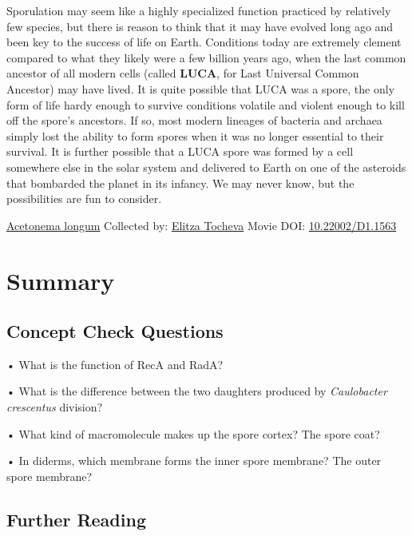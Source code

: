 \documentclass[]{tufte-book}
\begin{document}
Sporulation may seem like a highly specialized function practiced by relatively few species, but there is reason to think that it may have evolved long ago and been key to the success of life on Earth. Conditions today are extremely clement compared to what they likely were a few billion years ago, when the last common ancestor of all modern cells (called \textbf{LUCA}, for Last Universal Common Ancestor) may have lived. It is quite possible that LUCA was a spore, the only form of life hardy enough to survive conditions volatile and violent enough to kill off the spore's ancestors. If so, most modern lineages of bacteria and archaea simply lost the ability to form spores when it was no longer essential to their survival. It is further possible that a LUCA spore was formed by a cell somewhere else in the solar system and delivered to Earth on one of the asteroids that bombarded the planet in its infancy. We may never know, but the possibilities are fun to consider.



\hypertarget{htmlwidget-cfa92537eda9ede0c0c4}{}

\label{fig:8-11}\protect\hyperlink{tree}{Acetonema longum} Collected by: \protect\hyperlink{elitza_tocheva}{Elitza Tocheva} Movie DOI: \href{https://doi.org/10.22002/D1.1563}{10.22002/D1.1563}

\hypertarget{summary-7}{%
\section{Summary}\label{summary-7}}

\hypertarget{concept-check-questions-7}{%
\subsection*{Concept Check Questions}\label{concept-check-questions-7}}

• What is the function of RecA and RadA?

• What is the difference between the two daughters produced by \emph{Caulobacter crescentus} division?

• What kind of macromolecule makes up the spore cortex? The spore coat?

• In diderms, which membrane forms the inner spore membrane? The outer spore membrane?

\hypertarget{further-reading-7}{%
\subsection*{Further Reading}\label{further-reading-7}}
\end{document}
